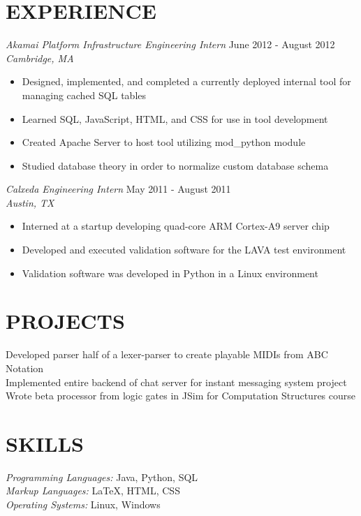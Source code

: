 \documentclass[margin]{res}
\begin{document}
\begin{resume}
\section{EXPERIENCE} {\sl Akamai Platform Infrastructure Engineering Intern} \hfill June 2012 -  August 2012 \\
                    {\sl Cambridge, MA}
                 \begin{itemize}  \itemsep -2pt %
                         \item  Designed, implemented, and completed a currently deployed internal tool for managing cached SQL tables
                         \item Learned SQL, JavaScript, HTML, and CSS for use in tool development
                         \item Created Apache Server to host tool utilizing mod\_python module 
                         \item Studied database theory in order to normalize custom database schema
                \end{itemize}

                {\sl Calxeda Engineering Intern} \hfill            May 2011 - August 2011 \\
                {\sl Austin, TX}
                 \begin{itemize}  \itemsep -2pt %
                                \item  Interned at a startup developing quad-core ARM Cortex-A9 server chip
                                \item Developed and executed validation software for the LAVA test environment
                                \item Validation software was developed in Python in a Linux environment
                 \end{itemize} 

\section{PROJECTS}Developed parser half of a lexer-parser to create playable MIDIs from ABC Notation \\
                Implemented entire backend of chat server for instant messaging system project \\
                Wrote beta processor from logic gates in JSim for Computation Structures course
 
\section{SKILLS} {\sl Programming Languages:} Java, Python, SQL \\
                 {\sl Markup Languages:} \LaTeX, HTML, CSS \\
                {\sl Operating Systems:} Linux, Windows
 

\end{resume}
\end{document}
